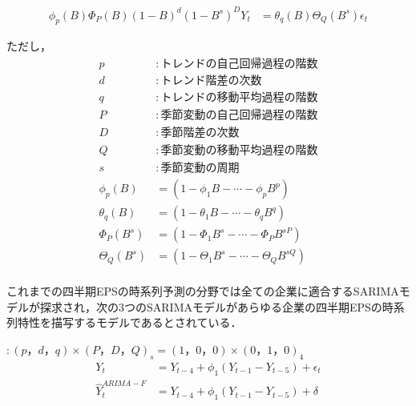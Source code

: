 \documentclass[a4paper，11pt]{jsarticle}
\begin{document}
\begin{equation}
  \begin{split}
    \phi_p(B)\Phi_{P}(B)(1-B)^d(1-B^s)^DY_t &= \theta_q(B)\Theta_Q(B^s)\epsilon_t
  \end{split}
\end{equation}

ただし，
\begin{equation}
  \begin{split}
    p &: トレンドの自己回帰過程の階数 \\
    d &: トレンド階差の次数 \\
    q &: トレンドの移動平均過程の階数 \\
    P &: 季節変動の自己回帰過程の階数 \\
    D &: 季節階差の次数 \\
    Q &: 季節変動の移動平均過程の階数 \\
    s &: 季節変動の周期 \\
    \phi_p(B) &= (1 - \phi_1B - \cdots - \phi_pB^p) \\
    \theta_q(B) &= (1 - \theta_1B - \cdots - \theta_qB^q) \\
    \Phi_P(B^s) &= (1 - \Phi_1B^s - \cdots - \Phi_PB^{sP}) \\
    \Theta_Q(B^s) &= (1 - \Theta_1B^s - \cdots - \Theta_QB^{sQ}) \\
  \end{split}
\end{equation}

これまでの四半期EPSの時系列予測の分野では全ての企業に適合するSARIMAモデルが探求され，次の3つのSARIMAモデル\citep*{foster1977quarterly, griffin1977time, brown1979univariate}があらゆる企業の四半期EPSの時系列特性を描写するモデルであるとされている．

\cite{foster1977quarterly} $: (p，d，q) \times (P，D，Q)_s = (1，0，0) \times (0，1，0)_4$
\begin{equation}
  \begin{split}
    Y_t &= Y_{t-4} + \phi_1(Y_{t-1} - Y_{t-5}) + \epsilon_t \\
    \hat{Y}_t^{ARIMA-F} &= Y_{t-4} + \phi_1(Y_{t-1} - Y_{t-5}) + \delta \\
  \end{split}
\end{equation}
\end{document}
